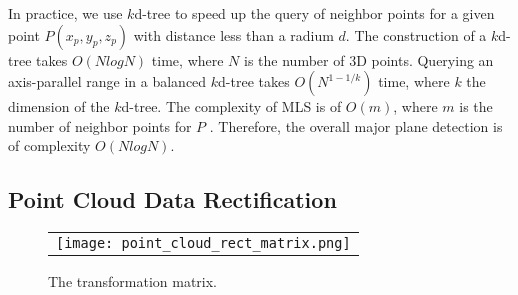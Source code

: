 
In practice, we use $k$d-tree \cite{NE_KD}
to speed up the query of neighbor points for a given point $P(x_p, y_p, z_p)$
with distance less than a radium $d$.
The construction of a $k$d-tree takes $O(NlogN)$ time,
where $N$ is the number of 3D points.
Querying an axis-parallel range in a balanced $k$d-tree takes $O(N^{1-1/k})$ time,
where $k$ the dimension of the $k$d-tree.
The complexity of MLS is of $O(m)$, where $m$ is the number of neighbor
points for $P$ \cite{MLS03}.
Therefore, the overall major plane detection is of complexity $O(NlogN)$.



\subsection{Point Cloud Data Rectification}
\label{sec:rect}

\begin{figure}[htbp]
\begin{center}
\begin{tabular}{c}
\texttt{[image: point\_cloud\_rect\_matrix.png]}
\end{tabular}
\end{center}
\caption{ The transformation matrix. }
\label{fig:pc_rect_matrix}
\end{figure}

